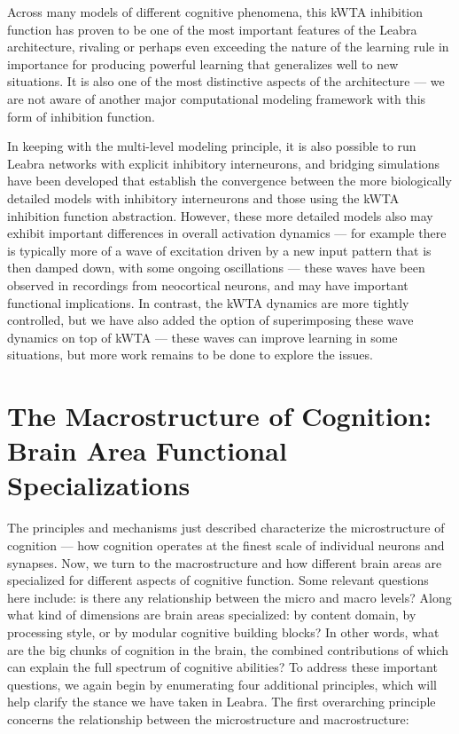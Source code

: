 \documentclass[11pt,twoside]{article}
\begin{document}
Across many models of different cognitive phenomena, this kWTA inhibition
function has proven to be one of the most important features of the Leabra
architecture, rivaling or perhaps even exceeding the nature of the learning
rule in importance for producing powerful learning that generalizes well to
new situations.  It is also one of the most distinctive aspects of the
architecture --- we are not aware of another major computational modeling
framework with this form of inhibition function.

In keeping with the multi-level modeling principle, it is also possible to run
Leabra networks with explicit inhibitory interneurons, and bridging
simulations have been developed that establish the convergence between the
more biologically detailed models with inhibitory interneurons and those using
the kWTA inhibition function abstraction.  However, these more detailed models
also may exhibit important differences in overall activation dynamics --- for
example there is typically more of a wave of excitation driven by a new input
pattern that is then damped down, with some ongoing oscillations --- these
waves have been observed in recordings from neocortical neurons, and may have
important functional implications.  In contrast, the kWTA dynamics are more
tightly controlled, but we have also added the option of superimposing these
wave dynamics on top of kWTA --- these waves can improve learning in some situations, but more work remains to be done to explore the
issues.


\section{The Macrostructure of Cognition: Brain Area Functional Specializations}

The principles and mechanisms just described characterize the microstructure
of cognition --- how cognition operates at the finest scale of individual
neurons and synapses.  Now, we turn to the macrostructure and how different
brain areas are specialized for different aspects of cognitive function.  Some
relevant questions here include: is there any relationship between the micro
and macro levels?  Along what kind of dimensions are brain areas specialized:
by content domain, by processing style, or by modular cognitive building
blocks?  In other words, what are the big chunks of cognition in the brain,
the combined contributions of which can explain the full spectrum of cognitive
abilities?  To address these important questions, we again begin by
enumerating four additional principles, which will help clarify the stance we
have taken in Leabra.  The first overarching principle concerns the
relationship between the microstructure and macrostructure:
\end{document}
